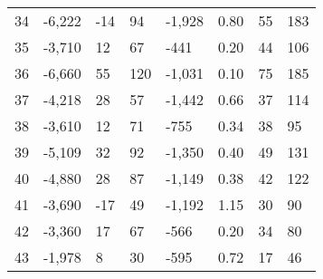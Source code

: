 \begin{appendices}
\begin{longtable}[c]{@{}llllllll@{}}
	34                       & -6,222                        & -14                          & 94                           & -1,928                   & 0.80                    & 55                   & 183                     \\
	35                       & -3,710                        & 12                           & 67                           & -441                     & 0.20                    & 44                   & 106                     \\
	36                       & -6,660                        & 55                           & 120                          & -1,031                   & 0.10                    & 75                   & 185                     \\
	37                       & -4,218                        & 28                           & 57                           & -1,442                   & 0.66                    & 37                   & 114                     \\
	38                       & -3,610                        & 12                           & 71                           & -755                     & 0.34                    & 38                   & 95                      \\
	39                       & -5,109                        & 32                           & 92                           & -1,350                   & 0.40                    & 49                   & 131                     \\
	40                       & -4,880                        & 28                           & 87                           & -1,149                   & 0.38                    & 42                   & 122                     \\
	41                       & -3,690                        & -17                          & 49                           & -1,192                   & 1.15                    & 30                   & 90                      \\
	42                       & -3,360                        & 17                           & 67                           & -566                     & 0.20                    & 34                   & 80                      \\
	43                       & -1,978                        & 8                            & 30                           & -595                     & 0.72                    & 17                   & 46                      \\

\end{longtable}
\end{appendices}
